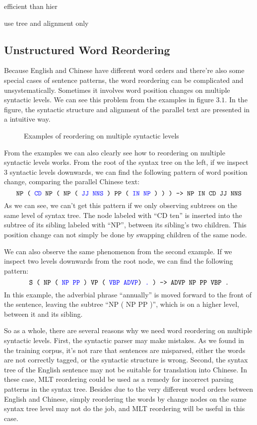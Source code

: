 efficient than hier

use tree and alignment only

\subsection{Unstructured Word Reordering}

Because English and Chinese have different word orders and there're also some special cases of sentence patterns, the word reordering can be complicated and unsystematically. Sometimes it involves word position changes on multiple syntactic levels. We can see this problem from the examples in figure $3.1$. In the figure, the syntactic structure and alignment of the parallel text are presented in a intuitive way.

\begin{figure}[H]
\centering
\subfigure {

}
\subfigure {

}
\caption{Examples of reordering on multiple syntactic levels}
\end{figure}

From the examples we can also clearly see how to reordering on multiple syntactic levels works. From the root of the syntax tree on the left, if we inspect 3 syntactic levels downwards, we can find the following pattern of word position change, comparing the parallel Chinese text:
$$\texttt{NP ( {\color{blue}CD} NP ( NP ( {\color{blue}JJ NNS} ) PP ( {\color{blue}IN NP} ) ) ) -> NP IN CD JJ NNS}$$
As we can see, we can't get this pattern if we only observing subtrees on the same level of syntax tree. The node labeled with ``CD ten'' is inserted into the subtree of its sibling labeled with ``NP'', between its sibling's two children. This position change can not simply be done by swapping children of the same node.

We can also observe the same phenomenon from the second example. If we inspect two levels downwards from the root node, we can find the following pattern:
$$\texttt{S ( NP ( {\color{blue}NP PP} ) VP ( {\color{blue}VBP ADVP}) {\color{blue}.} ) -> ADVP NP PP VBP .}$$
In this example, the adverbial phrase ``annually'' is moved forward to the front of the sentence, leaving the subtree ``NP ( NP PP )'', which is on a higher level, between it and its sibling.

So as a whole, there are several reasons why we need word reordering on multiple syntactic levels. First, the syntactic parser may make mistakes. As we found in the training corpus, it's not rare that sentences are misparsed, either the words are not correctly tagged, or the syntactic structure is wrong. Second, the syntax tree of the English sentence may not be suitable for translation into Chinese. In these case, MLT reordering could be used as a remedy for incorrect parsing patterns in the syntax tree. Besides due to the very different word orders between English and Chinese, simply reordering the words by change nodes on the same syntax tree level may not do the job, and MLT reordering will be useful in this case.

